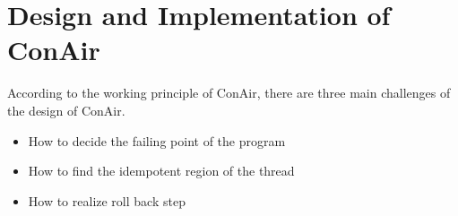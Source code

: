 \chapter{Design and Implementation of ConAir}
\label{chp:Design}
According to the working principle of ConAir, there are three main challenges of the design of ConAir. 
\begin{itemize}
\item
How to decide the failing point of the program
\item
How to find the idempotent region of the thread
\item
How to realize roll back step
\end{itemize}

